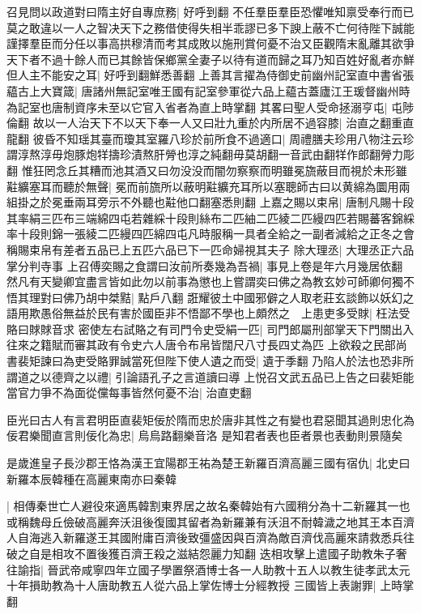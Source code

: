 召見問以政道對曰隋主好自專庶務|{
	好呼到翻}
不任羣臣羣臣恐懼唯知禀受奉行而已莫之敢違以一人之智决天下之務借使得失相半乖謬已多下諛上蔽不亡何待陛下誠能謹擇羣臣而分任以事高拱穆清而考其成敗以施刑賞何憂不治又臣觀隋末亂離其欲爭天下者不過十餘人而已其餘皆保鄉黨全妻子以待有道而歸之耳乃知百姓好亂者亦鮮但人主不能安之耳|{
	好呼到翻鮮悉善翻}
上善其言擢為侍御史前幽州記室直中書省張藴古上大寶箴|{
	唐諸州無記室唯王國有記室參軍從六品上藴古蓋廬江王瑗督幽州時為記室也唐制資序未至以它官入省者為直上時掌翻}
其畧曰聖人受命拯溺亨屯|{
	屯陟倫翻}
故以一人治天下不以天下奉一人又曰壯九重於内所居不過容膝|{
	治直之翻重直龍翻}
彼昏不知瑶其臺而瓊其室羅八珍於前所食不過適口|{
	周禮膳夫珍用八物注云珍謂淳熬淳毋炮豚炮䍧擣珍漬熬肝膋也淳之純翻毋莫胡翻一音武由翻䍧作郎翻膋力彫翻}
惟狂罔念丘其糟而池其酒又曰勿没没而闇勿察察而明雖冕旒蔽目而視於未形雖黈纊塞耳而聽於無聲|{
	冕而前旒所以蔽明黈纊充耳所以塞聰師古曰以黄綿為圜用兩組掛之於冕垂兩耳旁示不外聽也黈他口翻塞悉則翻}
上嘉之賜以束帛|{
	唐制凡賜十段其率絹三匹布三端綿四屯若雜綵十段則絲布二匹紬二匹綾二匹縵四匹若賜蕃客錦綵率十段則錦一張綾二匹縵四匹綿四屯凡時服稱一具者全給之一副者減給之正冬之會稱賜束帛有差者五品已上五匹六品已下一匹命婦視其夫子}
除大理丞|{
	大理丞正六品掌分判寺事}
上召傅奕賜之食謂曰汝前所奏幾為吾禍|{
	事見上卷是年六月幾居依翻}
然凡有天變卿宜盡言皆如此勿以前事為懲也上嘗謂奕曰佛之為教玄妙可師卿何獨不悟其理對曰佛乃胡中桀黠|{
	點戶八翻}
誑耀彼土中國邪僻之人取老莊玄談飾以妖幻之語用欺愚俗無益於民有害於國臣非不悟鄙不學也上頗然之　上患吏多受賕|{
	枉法受賂曰賕賕音求}
密使左右試賂之有司門令史受絹一匹|{
	司門郎屬刑部掌天下門關出入往來之籍賦而審其政有令史六人唐令布帛皆闊尺八寸長四丈為匹}
上欲殺之民部尚書裴矩諫曰為吏受賂罪誠當死但陛下使人遺之而受|{
	遺于季翻}
乃陷人於法也恐非所謂道之以德齊之以禮|{
	引論語孔子之言道讀曰導}
上悦召文武五品已上告之曰裴矩能當官力爭不為面從儻每事皆然何憂不治|{
	治直吏翻}


臣光曰古人有言君明臣直裴矩佞於隋而忠於唐非其性之有變也君惡聞其過則忠化為佞君樂聞直言則佞化為忠|{
	烏烏路翻樂音洛}
是知君者表也臣者景也表動則景隨矣

是歲進皇子長沙郡王恪為漢王宜陽郡王祐為楚王新羅百濟高麗三國有宿仇|{
	北史曰新羅本辰韓種在高麗東南亦曰秦韓}


|{
	相傳秦世亡人避役來適馬韓割東界居之故名秦韓始有六國稍分為十二新羅其一也或稱魏母丘儉破高麗奔沃沮後復國其留者為新羅兼有沃沮不耐韓濊之地其王本百濟人自海逃入新羅遂王其國附庸百濟後致彊盛因與百濟為敵百濟伐高麗來請救悉兵往破之自是相攻不置後獲百濟王殺之滋結怨麗力知翻}
迭相攻擊上遣國子助教朱子奢往諭指|{
	晉武帝咸寧四年立國子學置祭酒博士各一人助教十五人以教生徒孝武太元十年損助教為十人唐助教五人從六品上掌佐博士分經教授}
三國皆上表謝罪|{
	上時掌翻}


